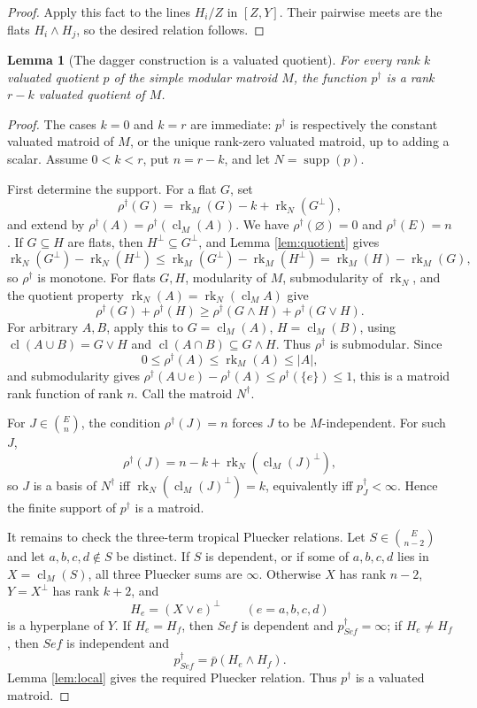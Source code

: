 \documentclass[12pt]{article}
\newtheorem{lemma}[theorem]{Lemma}
\theoremstyle{definition}
\newcommand{\rk}{\operatorname{rk}}
\newcommand{\cl}{\operatorname{cl}}
\newcommand{\supp}{\operatorname{supp}}
\newcommand{\binomE}[1]{\binom{E}{#1}}
\begin{document}
\begin{proof}
Apply this fact to the lines \(H_i/Z\) in \([Z,Y]\).  Their pairwise meets are the flats \(H_i\wedge H_j\), so the desired relation follows.
\end{proof}

\begin{lemma}[The dagger construction is a valuated quotient]\label{lem:daggerquotient}
For every rank \(k\) valuated quotient \(p\) of the simple modular matroid \(M\), the function \(p^\dagger\) is a rank \(r-k\) valuated quotient of \(M\).
\end{lemma}

\begin{proof}
The cases \(k=0\) and \(k=r\) are immediate: \(p^\dagger\) is respectively the constant valuated matroid of \(M\), or the unique rank-zero valuated matroid, up to adding a scalar.  Assume \(0<k<r\), put \(n=r-k\), and let \(N=\supp(p)\).

First determine the support.  For a flat \(G\), set
\[
\rho^\dagger(G)=\rk_M(G)-k+\rk_N(G^\perp),
\]
and extend by \(\rho^\dagger(A)=\rho^\dagger(\cl_M(A))\).  We have \(\rho^\dagger(\varnothing)=0\) and \(\rho^\dagger(E)=n\).  If \(G\subseteq H\) are flats, then \(H^\perp\subseteq G^\perp\), and Lemma \ref{lem:quotient} gives
\[
\rk_N(G^\perp)-\rk_N(H^\perp)\le \rk_M(G^\perp)-\rk_M(H^\perp)=\rk_M(H)-\rk_M(G),
\]
so \(\rho^\dagger\) is monotone.  For flats \(G,H\), modularity of \(M\), submodularity of \(\rk_N\), and the quotient property
\(\rk_N(A)=\rk_N(\cl_M A)\) give
\[
\rho^\dagger(G)+\rho^\dagger(H)\ge
\rho^\dagger(G\wedge H)+\rho^\dagger(G\vee H).
\]
For arbitrary \(A,B\), apply this to \(G=\cl_M(A)\), \(H=\cl_M(B)\), using \(\cl(A\cup B)=G\vee H\) and \(\cl(A\cap B)\subseteq G\wedge H\).  Thus \(\rho^\dagger\) is submodular.  Since
\[
0\le \rho^\dagger(A)\le \rk_M(A)\le |A|,
\]
and submodularity gives \(\rho^\dagger(A\cup e)-\rho^\dagger(A)\le\rho^\dagger(\{e\})\le 1\), this is a matroid rank function of rank \(n\).  Call the matroid \(N^\dagger\).

For \(J\in\binomE n\), the condition \(\rho^\dagger(J)=n\) forces \(J\) to be \(M\)-independent.  For such \(J\),
\[
\rho^\dagger(J)=n-k+\rk_N(\cl_M(J)^\perp),
\]
so \(J\) is a basis of \(N^\dagger\) iff \(\rk_N(\cl_M(J)^\perp)=k\), equivalently iff \(p^\dagger_J<\infty\).  Hence the finite support of \(p^\dagger\) is a matroid.

It remains to check the three-term tropical Pluecker relations.  Let \(S\in\binomE{n-2}\) and let \(a,b,c,d\notin S\) be distinct.  If \(S\) is dependent, or if some of \(a,b,c,d\) lies in \(X=\cl_M(S)\), all three Pluecker sums are \(\infty\).  Otherwise \(X\) has rank \(n-2\), \(Y=X^\perp\) has rank \(k+2\), and
\[
H_e=(X\vee e)^\perp\qquad(e=a,b,c,d)
\]
is a hyperplane of \(Y\).  If \(H_e=H_f\), then \(Sef\) is dependent and \(p^\dagger_{Sef}=\infty\); if \(H_e\ne H_f\), then \(Sef\) is independent and
\[
p^\dagger_{Sef}=\bar p(H_e\wedge H_f).
\]
Lemma \ref{lem:local} gives the required Pluecker relation.  Thus \(p^\dagger\) is a valuated matroid.


\end{proof}
\end{document}
